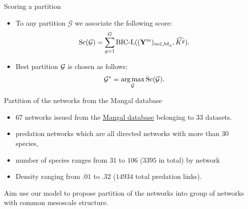 \documentclass[compress,10pt]{beamer}
\begin{document}
\begin{frame}{Scoring a partition}

\begin{itemize}
\item To any partition $\mathcal{G}$ we associate the following score: 
\begin{equation*}\label{coll:ICL:partition}
  \text{Sc}(\mathcal{G}) =   \sum_{g  = 1} ^G \text{BIC-L}((\mathbf{Y}^m)_{m \in \mathcal{M}_g}, \widehat{K^g}).
\end{equation*}

\item Best partition $\mathcal{G}$ is chosen as follows:  
\begin{equation*}
    \mathcal{G}^* = \operatorname*{arg\,max}_{\mathcal{G}} \text{Sc}(\mathcal{G}).
\end{equation*}


\end{itemize}
  
\end{frame}  
    

\begin{frame}{Partition of the networks from the Mangal database}

\begin{itemize}
 \item $67$ networks issued from the \href{https://mangal.io}{Mangal database} belonging to 33 datasets.
\cite{rmangal}

\item predation networks which are all directed networks with more than $30$ species,
\item number of species ranges from $31$ to $106$ ($3395$ in total) by network
\item Density ranging from $.01$ to $.32$ ($14934$ total predation links). 
\end{itemize}


\alert{Aim} use our model to propose partition of the networks into group of networks with common mesoscale structure.  

\end{frame}
\end{document}
